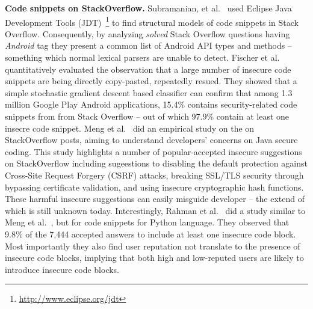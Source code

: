 
\textbf{Code snippets on StackOverflow.} Subramanian, et al.~\cite{subramanian2013making} used Eclipse Java Development Tools (JDT)~\footnote{\url{http://www.eclipse.org/jdt}}  to find structural models of code snippets in Stack Overflow. Consequently, by analyzing \textit{solved} Stack Overflow questions having \textit{Android} tag they present a common list of Android API types and methods -- something which normal lexical parsers are unable to detect. Fischer et al.~\cite{fischer2017stack}  quantitatively evaluated the observation that a large number of insecure code snippets are being directly copy-pasted, repeatedly resued. They showed that a simple stochastic gradient descent based classifier can confirm that among 1.3 million Google Play Android applications, 15.4\% contains security-related code snippets from  from Stack Overflow -- out of which 97.9\% contain at least one insecre code snippet. Meng et al.~\cite{meng2018secure} did an empirical study on the on StackOverflow posts, aiming to understand developers’ concerns on Java secure coding. This study highlights a number of popular-accepted insecure suggestions on  StackOverflow including sugeestions to disabling the default protection against Cross-Site Request Forgery (CSRF) attacks, breaking SSL/TLS security through bypassing certificate validation, and using insecure cryptographic hash functions. These harmful insecure suggestions can easily misguide developer -- the extend of which is still unknown today. Interestingly, Rahman et al.~\cite{akondsnakes} did a study similar to Meng et al.~\cite{meng2018secure}, but for code snippets for Python language. They observed that 9.8\% of the 7,444 accepted answers to include at least one insecure code block. Most importantly they also find user reputation not
translate to the presence of insecure code blocks, implying  that both high and low-reputed users are likely to introduce insecure code blocks. 


